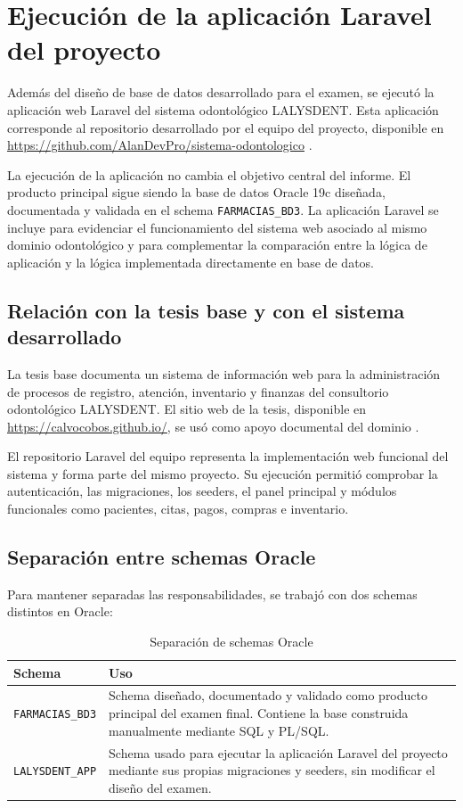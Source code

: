 \section{Ejecución de la aplicación Laravel del proyecto}

Además del diseño de base de datos desarrollado para el examen, se ejecutó la aplicación web Laravel del sistema odontológico LALYSDENT. Esta aplicación corresponde al repositorio desarrollado por el equipo del proyecto, disponible en \url{https://github.com/AlanDevPro/sistema-odontologico} \parencite{sistemaodontologicogithub}.

La ejecución de la aplicación no cambia el objetivo central del informe. El producto principal sigue siendo la base de datos Oracle 19c diseñada, documentada y validada en el schema \texttt{FARMACIAS\_BD3}. La aplicación Laravel se incluye para evidenciar el funcionamiento del sistema web asociado al mismo dominio odontológico y para complementar la comparación entre la lógica de aplicación y la lógica implementada directamente en base de datos.

\subsection{Relación con la tesis base y con el sistema desarrollado}

La tesis base documenta un sistema de información web para la administración de procesos de registro, atención, inventario y finanzas del consultorio odontológico LALYSDENT. El sitio web de la tesis, disponible en \url{https://calvocobos.github.io/}, se usó como apoyo documental del dominio \parencite{calvocobos2025web}.

El repositorio Laravel del equipo representa la implementación web funcional del sistema y forma parte del mismo proyecto. Su ejecución permitió comprobar la autenticación, las migraciones, los seeders, el panel principal y módulos funcionales como pacientes, citas, pagos, compras e inventario.

\subsection{Separación entre schemas Oracle}

Para mantener separadas las responsabilidades, se trabajó con dos schemas distintos en Oracle:

\begin{table}[H]
\caption{Separación de schemas Oracle}
\centering
\small
\begin{tabularx}{\textwidth}{L{0.28\textwidth}Y}
\toprule
\textbf{Schema} & \textbf{Uso} \\
\midrule
\texttt{FARMACIAS\_BD3} & Schema diseñado, documentado y validado como producto principal del examen final. Contiene la base construida manualmente mediante SQL y PL/SQL. \\
\texttt{LALYSDENT\_APP} & Schema usado para ejecutar la aplicación Laravel del proyecto mediante sus propias migraciones y seeders, sin modificar el diseño del examen. \\
\bottomrule
\end{tabularx}
\end{table}

